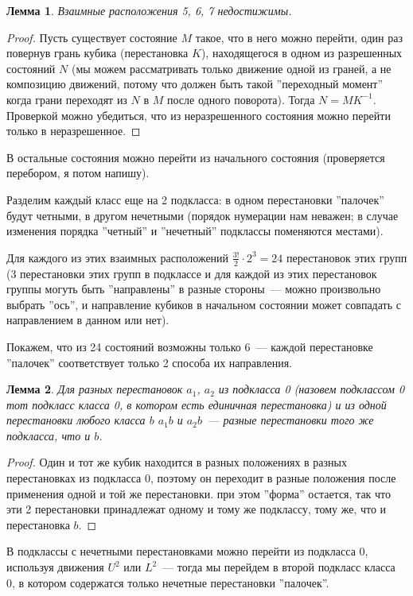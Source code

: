 \documentclass[utf8,a4paper,draft]{article}
\newtheorem{lemma_cub}{Лемма}
\begin{document}
\begin{lemma_cub}
\label{lemma_states}
Взаимные расположения 5, 6, 7 недостижимы.
\end{lemma_cub}
\begin{proof}
Пусть существует состояние $M$ такое, что в него можно перейти, один раз повернув грань кубика (перестановка $K$), находящегося в одном из разрешенных состояний $N$ (мы можем рассматривать только движение одной из граней, а не композицию движений, потому что должен быть такой ''переходный момент'' когда грани переходят из $N$ в $M$ после одного поворота). Тогда $N=MK^{-1}$. Проверкой можно убедиться, что из неразрешенного состояния можно перейти только в неразрешенное. 
\end{proof}
В остальные состояния можно перейти из начального состояния (проверяется перебором, я потом напишу). 

Разделим каждый класс еще на 2 подкласса: в одном перестановки ''палочек''  будут четными, в другом нечетными (порядок нумерации нам неважен; в случае изменения порядка ''четный'' и ''нечетный'' подклассы поменяются местами).

Для каждого из этих взаимных расположений $\frac{3!}{2}\cdot 2^3=24$ перестановок этих групп (3 перестановки этих групп в подклассе и для каждой из этих перестановок группы могуть быть ''направлены'' в разные стороны~--- можно произвольно выбрать ''ось'', и направление кубиков в начальном состоянии может совпадать с направлением в данном или нет).

Покажем, что из 24 состояний возможны только 6~--- каждой перестановке ''палочек'' соответствует только 2 способа их направления.
\begin{lemma_cub}
Для разных перестановок $a_1$, $a_2$ из подкласса 0 (назовем подклассом 0 тот подкласс класса 0, в котором есть единичная перестановка) и из одной перестановки любого класса $b$ $a_1b$ и $a_2b$~--- разные перестановки того же подкласса, что и $b$.\label{lemma_classes}
\end{lemma_cub}
\begin{proof}
Один и тот же кубик находится в разных положениях в разных перестановках из подкласса 0, поэтому он переходит в разные положения после применения одной и той же перестановки. при этом ''форма'' остается, так что эти 2 перестановки принадлежат одному и тому же подклассу, тому же, что и перестановка $b$.
\end{proof}
В подклассы с нечетными перестановками можно перейти из подкласса 0, используя движения $U^2$ или $L^2$~--- тогда мы перейдем в второй подкласс класса 0, в котором содержатся только нечетные перестановки ''палочек''.
\end{document}

